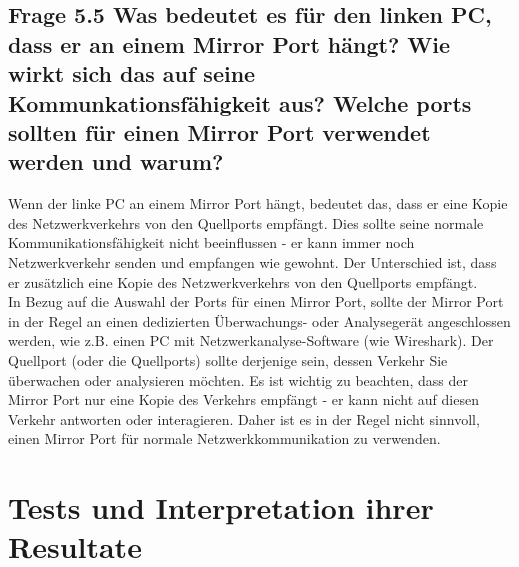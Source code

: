 \documentclass{article}
\begin{document}
\subsection*{Frage 5.5 \normalfont Was bedeutet es für den linken PC, dass er an einem Mirror Port hängt? Wie wirkt sich das auf seine Kommunkationsfähigkeit aus? Welche ports sollten für einen Mirror Port verwendet werden und warum?}
Wenn der linke PC an einem Mirror Port hängt, bedeutet das, dass er eine Kopie des Netzwerkverkehrs von den Quellports empfängt. Dies sollte seine normale Kommunikationsfähigkeit nicht beeinflussen - er kann immer noch Netzwerkverkehr senden und empfangen wie gewohnt. Der Unterschied ist, dass er zusätzlich eine Kopie des Netzwerkverkehrs von den Quellports empfängt.\\

\noindent In Bezug auf die Auswahl der Ports für einen Mirror Port, sollte der Mirror Port in der Regel an einen dedizierten Überwachungs- oder Analysegerät angeschlossen werden, wie z.B. einen PC mit Netzwerkanalyse-Software (wie Wireshark). Der Quellport (oder die Quellports) sollte derjenige sein, dessen Verkehr Sie überwachen oder analysieren möchten. Es ist wichtig zu beachten, dass der Mirror Port nur eine Kopie des Verkehrs empfängt - er kann nicht auf diesen Verkehr antworten oder interagieren. Daher ist es in der Regel nicht sinnvoll, einen Mirror Port für normale Netzwerkkommunikation zu verwenden.\\

\pagebreak
\section{Tests und Interpretation ihrer Resultate}
\end{document}
